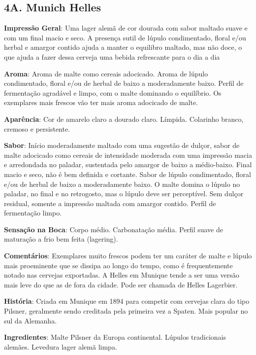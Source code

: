 \subsection*{4A. Munich Helles}

\textbf{Impressão Geral}: Uma lager alemã de cor dourada com sabor maltado suave e com um final macio e seco. A presença sutil de lúpulo condimentado, floral e/ou herbal e amargor contido ajuda a manter o equilibro maltado, mas não doce, o que ajuda a fazer dessa cerveja uma bebida refrescante para o dia a dia

\textbf{Aroma}: Aroma de malte como cereais adocicado. Aroma de lúpulo condimentado, floral e/ou de herbal de baixo a moderadamente baixo. Perfil de fermentação agradável e limpo, com o malte dominando o equilíbrio. Os exemplares mais frescos vão ter mais aroma adocicado de malte.

\textbf{Aparência}: Cor de amarelo claro a dourado claro. Límpida. Colarinho branco, cremoso e persistente.

\textbf{Sabor}: Início moderadamente maltado com uma sugestão de dulçor, sabor de malte adocicado como cereais de intensidade moderada com uma impressão macia e arredondada no paladar, sustentada pelo amargor de baixo a médio-baixo. Final macio e seco, não é bem definida e cortante. Sabor de lúpulo condimentado, floral e/ou de herbal de baixo a moderadamente baixo. O malte domina o lúpulo no paladar, no final e no retrogosto, mas o lúpulo deve ser perceptível. Sem dulçor residual, somente a impressão maltada com amargor contido. Perfil de fermentação limpo.

\textbf{Sensação na Boca}: Corpo médio. Carbonatação média. Perfil suave de maturação a frio bem feita (lagering).

\textbf{Comentários}: Exemplares muito frescos podem ter um caráter de malte e lúpulo mais proeminente que se dissipa ao longo do tempo, como é frequentemente notado nas cervejas exportadas. A Helles em Munique tende a ser uma versão mais leve do que as de fora da cidade. Pode ser chamada de Helles Lagerbier.

\textbf{História}: Criada em Munique em 1894 para competir com cervejas clara do tipo Pilsner, geralmente sendo creditada pela primeira vez a Spaten. Mais popular no sul da Alemanha.

\textbf{Ingredientes}: Malte Pilsner da Europa continental. Lúpulos tradicionais alemães. Levedura lager alemã limpa.

